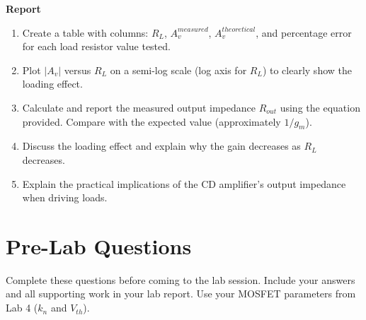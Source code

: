 \documentclass[10pt]{article}
\begin{document}
\textbf{Report}
\begin{enumerate}
    \item Create a table with columns: $R_L$, $A_v^{measured}$, $A_v^{theoretical}$, and percentage error for each load resistor value tested.
    \item Plot $|A_v|$ versus $R_L$ on a semi-log scale (log axis for $R_L$) to clearly show the loading effect.
    \item Calculate and report the measured output impedance $R_{out}$ using the equation provided. Compare with the expected value (approximately $1/g_m$).
    \item Discuss the loading effect and explain why the gain decreases as $R_L$ decreases.
    \item Explain the practical implications of the CD amplifier's output impedance when driving loads.\\
\end{enumerate}

\section{Pre-Lab Questions}
\label{sec:prelab}

Complete these questions before coming to the lab session.  Include your answers and all supporting work in your lab report.  Use your MOSFET parameters from Lab 4 ($k_n$ and $V_{th}$).
\end{document}
